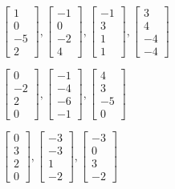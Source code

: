 \begin{exercise}
\begin{Parts}
\item \(\begin{bmatrix} 1\\0\\-5\\2 \end{bmatrix}, \begin{bmatrix}-1\\0\\-2\\4 \end{bmatrix}, \begin{bmatrix}-1\\3\\1\\1 \end{bmatrix}, \begin{bmatrix} 3\\4\\-4\\-4 \end{bmatrix}\)

\begin{OmitV1}
\item \(\begin{bmatrix} 0\\-2\\2\\0 \end{bmatrix}, \begin{bmatrix}-1\\-4\\-6\\-1 \end{bmatrix}, \begin{bmatrix} 4\\3\\-5\\0 \end{bmatrix}\)

\item \(\begin{bmatrix} 0\\3\\2\\0 \end{bmatrix}, \begin{bmatrix}-3\\-3\\1\\-2 \end{bmatrix}, \begin{bmatrix}-3\\0\\3\\-2 \end{bmatrix}\)


\end{OmitV1}
\end{Parts}
\end{exercise}
